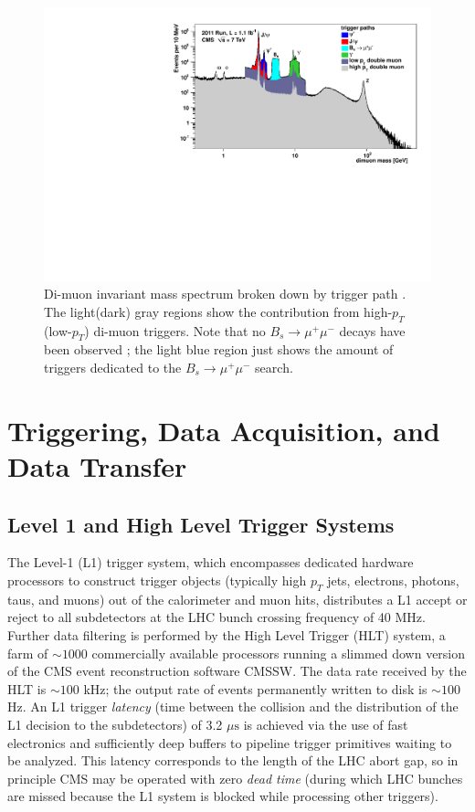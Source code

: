 \documentclass[dissertation.tex]{subfiles}
\begin{document}
\begin{figure}
	\centering
	\includegraphics[scale=0.7]{muon_inv_mass}
	\caption{Di-muon invariant mass spectrum broken down by trigger path \cite{MUO_POG_Twiki_inv_mass}.  The light(dark) gray regions show the contribution from high-$p_{T}$(low-$p_{T}$) di-muon triggers.  Note that no $B_{s}\rightarrow\mu^{+}\mu^{-}$ decays have been observed \cite{CMS-BPH-11-020}; the light blue region just shows the amount of triggers dedicated to the $B_{s}\rightarrow\mu^{+}\mu^{-}$ search.}
	\label{fig:muon_inv_mass}
\end{figure}

\section{Triggering, Data Acquisition, and Data Transfer}
\label{sec:Triggering, Data Acquisition, and Data Transfer}

\subsection{Level 1 and High Level Trigger Systems}
\label{sec:Level 1 and High Level Trigger Systems}

The Level-1 (L1) trigger system, which encompasses dedicated hardware processors to construct trigger objects (typically high $p_{T}$ jets, electrons, photons, taus, and muons) out of the calorimeter and muon hits, distributes a L1 accept or reject to all subdetectors at the LHC bunch crossing frequency of 40 MHz.  Further data filtering is performed by the High Level Trigger (HLT) system, a farm of $\sim1000$ commercially available processors running a slimmed down version of the CMS event reconstruction software CMSSW.  The data rate received by the HLT is $\sim100$ kHz; the output rate of events permanently written to disk is $\sim100$ Hz.  An L1 trigger \textit{latency} (time between the collision and the distribution of the L1 decision to the subdetectors) of 3.2 $\mu\mbox{s}$ is achieved via the use of fast electronics and sufficiently deep buffers to pipeline trigger primitives waiting to be analyzed.  This latency corresponds to the length of the LHC abort gap, so in principle CMS may be operated with zero \textit{dead time} (during which LHC bunches are missed because the L1 system is blocked while processing other triggers).
\end{document}
